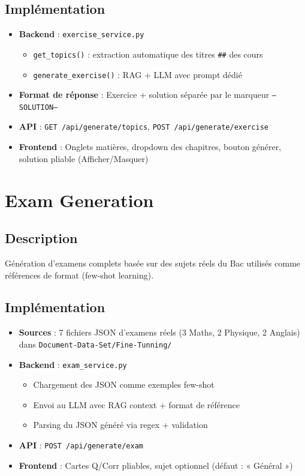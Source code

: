 \documentclass[12pt,a4paper]{report}
\begin{document}
\subsection{Implémentation}
\begin{itemize}
    \item \textbf{Backend} : \texttt{exercise\_service.py}
    \begin{itemize}
        \item \texttt{get\_topics()} : extraction automatique des titres \texttt{##} des cours
        \item \texttt{generate\_exercise()} : RAG + LLM avec prompt dédié
    \end{itemize}
    \item \textbf{Format de réponse} : Exercice + solution séparée par le marqueur \texttt{---SOLUTION---}
    \item \textbf{API} : \texttt{GET /api/generate/topics}, \texttt{POST /api/generate/exercise}
    \item \textbf{Frontend} : Onglets matières, dropdown des chapitres, bouton générer, solution pliable (Afficher/Masquer)
\end{itemize}

\section{Exam Generation}

\subsection{Description}
Génération d'examens complets basée sur des sujets réels du Bac utilisés comme références de format (few-shot learning).

\subsection{Implémentation}
\begin{itemize}
    \item \textbf{Sources} : 7 fichiers JSON d'examens réels (3 Maths, 2 Physique, 2 Anglais) dans \texttt{Document-Data-Set/Fine-Tunning/}
    \item \textbf{Backend} : \texttt{exam\_service.py}
    \begin{itemize}
        \item Chargement des JSON comme exemples few-shot
        \item Envoi au LLM avec RAG context + format de référence
        \item Parsing du JSON généré via regex + validation
    \end{itemize}
    \item \textbf{API} : \texttt{POST /api/generate/exam}
    \item \textbf{Frontend} : Cartes Q/Corr pliables, sujet optionnel (défaut : « Général »)
\end{itemize}
\end{document}
